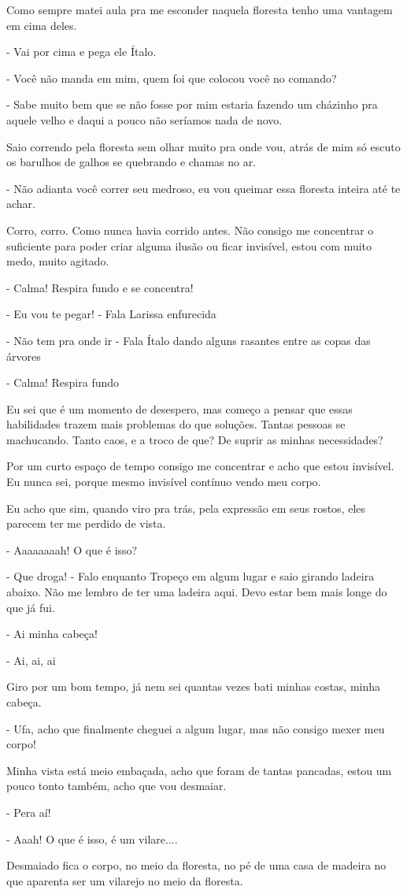 Como sempre matei aula pra me esconder naquela floresta tenho uma vantagem em cima deles.

- Vai por cima e pega ele Ítalo.

- Você não manda em mim, quem foi que colocou você no comando?

- Sabe muito bem que se não fosse por mim estaria fazendo um cházinho pra aquele velho e daqui a pouco não seríamos nada de novo.

Saio correndo pela floresta sem olhar muito pra onde vou, atrás de mim só escuto os barulhos de galhos se quebrando e chamas no ar.

- Não adianta você correr seu medroso, eu vou queimar essa floresta inteira até te achar.

Corro, corro. Como nunca havia corrido antes. Não consigo me concentrar o suficiente para poder criar alguma ilusão ou ficar invisível, estou com muito medo, muito agitado.

- Calma! Respira fundo e se concentra!

- Eu vou te pegar! - Fala Larissa enfurecida

- Não tem pra onde ir - Fala Ítalo dando alguns rasantes entre as copas das árvores

- Calma! Respira fundo

Eu sei que é um momento de desespero, mas começo a pensar que essas habilidades trazem mais problemas do que soluções. Tantas pessoas se machucando. Tanto caos, e a troco de que? De suprir as minhas necessidades?

Por um curto espaço de tempo consigo me concentrar e acho que estou invisível. Eu nunca sei, porque mesmo invisível contínuo vendo meu corpo.

Eu acho que sim, quando viro pra trás, pela expressão em seus rostos, eles parecem ter me perdido de vista.

- Aaaaaaaah! O que é isso?

- Que droga! - Falo enquanto Tropeço em algum lugar e saio girando ladeira abaixo. Não me lembro de ter uma ladeira aqui. Devo estar bem mais longe do que já fui.

- Ai minha cabeça!

- Ai, ai, ai

Giro por um bom tempo, já nem sei quantas vezes bati minhas costas, minha cabeça.

- Ufa, acho que finalmente cheguei a algum lugar, mas não consigo mexer meu corpo!

Minha vista está meio embaçada, acho que foram de tantas pancadas, estou um pouco tonto também, acho que vou desmaiar. 

- Pera aí!

- Aaah! O que é isso, é um vilare....

Desmaiado fica o corpo, no meio da floresta, no pé de uma casa de madeira no que aparenta ser um vilarejo no meio da floresta.



